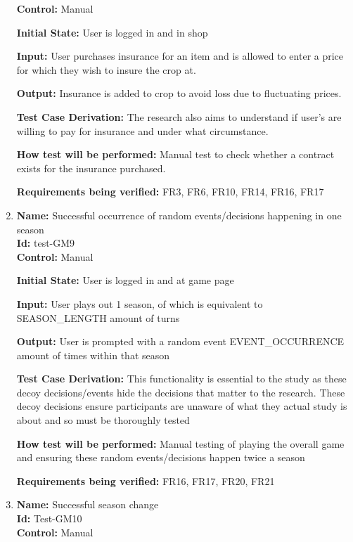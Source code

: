 \documentclass[12pt, titlepage]{article}
\begin{document}
\begin{enumerate}
\textbf{Control:} Manual 

\textbf{Initial State:} User is logged in and in shop

\textbf{Input:} User purchases insurance for an item and is allowed to enter a price for which they wish to insure the crop at.

\textbf{Output:} Insurance is added to crop to avoid loss due to fluctuating prices.

\textbf{Test Case Derivation:} The research also aims to understand if user's are willing to pay for insurance and under what circumstance.

\textbf{How test will be performed:} Manual test to check whether a contract exists for the insurance purchased.

\textbf{Requirements being verified:} FR3, FR6, FR10, FR14, FR16, FR17

\item{\textbf{Name:} Successful occurrence of random events/decisions happening in one season\\} %
\textbf{Id:} test-GM9 \label{Test-GM9}\\

\textbf{Control:} Manual
					
\textbf{Initial State: }User is logged in and at game page
					
\textbf{Input:} User plays out 1 season, of which is equivalent to SEASON\_LENGTH amount of turns
					
\textbf{Output:} User is prompted with a random event EVENT\_OCCURRENCE amount of times within that season

\textbf{Test Case Derivation:} This functionality is essential to the study as these decoy decisions/events hide the decisions that matter to the research. These decoy decisions ensure participants are unaware of what they actual study is about and so must be thoroughly tested

\textbf{How test will be performed:} Manual testing of playing the overall game and ensuring these random events/decisions happen twice a season

\textbf{Requirements being verified:}  FR16, FR17, FR20, FR21

\item{\textbf{Name:} Successful season change\\} %
\textbf{Id:} Test-GM10 \label{Test-GM10}\\

\textbf{Control:} Manual


\end{enumerate}
\end{document}
